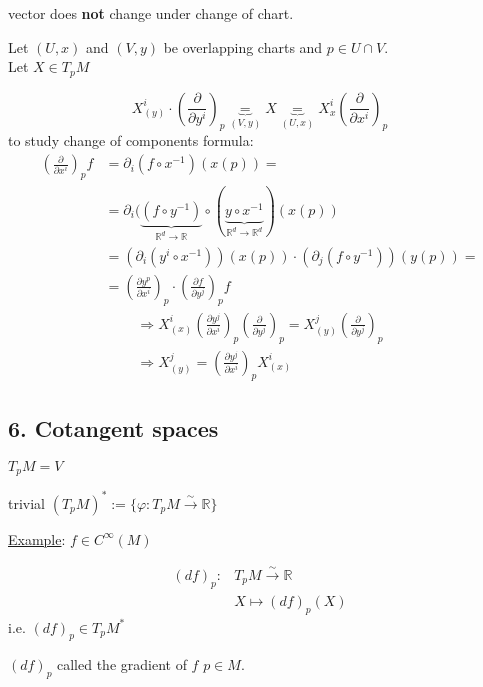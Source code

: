  vector does \textbf{not} change under change of chart.

Let $(U,x)$ and $(V,y)$ be overlapping charts and $p \in U\cap V$.  \\
Let $X \in T_pM$

\[
X^i_{(y)}\cdot \left( \frac{ \partial }{ \partial y^i} \right)_p \underbrace{=}_{(V,y)} X \underbrace{=}_{ (U,x) } X^i_{x} \left( \frac{ \partial }{ \partial x^i} \right)_p
\]
to study change of components formula:
\[
\begin{aligned}
  \left( \frac{ \partial }{ \partial x^i} \right)_p f & = \partial_i(f\circ x^{-1} )(x(p)) =  \\
  & = \partial_i (\underbrace{ (f\circ y^{-1}) }_{\mathbb{R}^d \to \mathbb{R} } \circ (\underbrace{ y\circ x^{-1}}_{\mathbb{R}^d \to \mathbb{R}^d} )(x(p)) \\
  & = (\partial_i (y^i\circ x^{-1} ) )(x(p)) \cdot (\partial_j (f\circ y^{-1}) )(y(p)) = \\
  & = \boxed{ \left( \frac{ \partial y^p}{ \partial x^i} \right)_p \cdot \left( \frac{ \partial f}{ \partial y^j} \right)_p  } f
\end{aligned}
\]
\[
\begin{gathered}
  \Longrightarrow X^i_{(x)} \left( \frac{ \partial y^j}{ \partial x^i} \right)_p \left( \frac{ \partial }{ \partial y^j} \right)_p = X^j_{(y)}\left( \frac{ \partial }{ \partial y^j} \right)_p \\
  \Longrightarrow \boxed{ X^j_{(y)} = \left( \frac{ \partial y^j}{ \partial x^i} \right)_pX^i_{(x)} }
\end{gathered}
\]

\subsection{6. Cotangent spaces }

$T_pM = V$

trivial $(T_pM)^* := \lbrace \varphi : T_pM \xrightarrow{\sim} \mathbb{R} \rbrace$

\underline{Example}: $f\in C^{\infty}(M)$ 

\[
\begin{aligned}
  (df)_p : & T_p M \xrightarrow{ \sim } \mathbb{R} \\ 
  & X \mapsto (df)_p(X)
\end{aligned}
\]
i.e. $\boxed{ (df)_p \in T_pM^* } $

$(df)_p$ called the gradient of $f$ \@ $p\in M$.  


